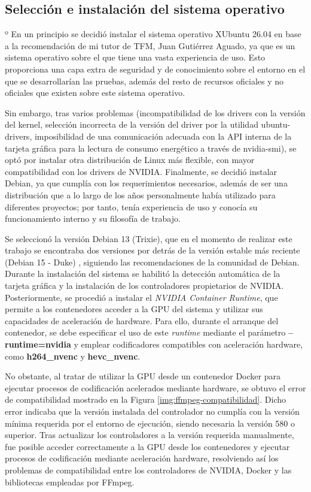 


\subsection{Selección e instalación del sistema operativo} \label{sec:entrono-desarrollo}º
 En un principio se decidió instalar el sistema operativo XUbuntu 26.04 en base a la recomendación de mi tutor de TFM, Juan Gutiérrez Aguado, ya que es un sistema operativo sobre el que tiene una vasta experiencia de uso. Esto proporciona una capa extra de seguridad y de conocimiento sobre el entorno en el que se desarrollarían las pruebas, además del resto de recursos oficiales y no oficiales que existen sobre este sistema operativo.

 Sin embargo, tras varios problemas (incompatibilidad de los drivers con la versión del kernel, selección incorrecta de la versión del driver por la utilidad ubuntu-drivers, imposibilidad de una comunicación adecuada con la API interna de la tarjeta gráfica para la lectura de consumo energético a través de nvidia-smi), se optó por instalar otra distribución de Linux más flexible, con mayor compatibilidad con los drivers de NVIDIA. Finalmente, se decidió instalar Debian, ya que cumplía con los requerimientos necesarios, además de ser una distribución que a lo largo de los años personalmente había utilizado para diferentes proyectos; por tanto, tenía experiencia de uso y conocía su funcionamiento interno y su filosofía de trabajo.

 Se seleccionó la versión Debian 13 (Trixie), que en el momento de realizar este trabajo se encontraba dos versiones por detrás de la versión estable más reciente (Debian 15 - Duke) \cite{debian-releases}, siguiendo las recomendaciones de la comunidad de Debian. Durante la instalación del sistema se habilitó la detección automática de la tarjeta gráfica y la instalación de los controladores propietarios de NVIDIA. Posteriormente, se procedió a instalar el \textit{NVIDIA Container Runtime}, que permite a los contenedores acceder a la GPU del sistema y utilizar sus capacidades de aceleración de hardware. Para ello, durante el arranque del contenedor, se debe especificar el uso de este \textit{runtime} mediante el parámetro \textbf{--runtime=nvidia} y emplear codificadores compatibles con aceleración hardware, como \textbf{h264\_nvenc} y \textbf{hevc\_nvenc}.

 No obstante, al tratar de utilizar la GPU desde un contenedor Docker para ejecutar procesos de codificación acelerados mediante hardware, se obtuvo el error de compatibilidad mostrado en la Figura \ref{img:ffmpeg-compatibilidad}. Dicho error indicaba que la versión instalada del controlador no cumplía con la versión mínima requerida por el entorno de ejecución, siendo necesaria la versión 580 o superior. Tras actualizar los controladores a la versión requerida manualmente, fue posible acceder correctamente a la GPU desde los contenedores y ejecutar procesos de codificación mediante aceleración hardware, resolviendo así los problemas de compatibilidad entre los controladores de NVIDIA, Docker y las bibliotecas empleadas por FFmpeg.

